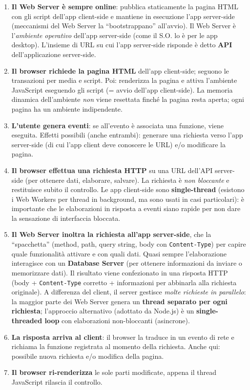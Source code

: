 \begin{enumerate}
  \item \textbf{Il Web Server \`e sempre online}: pubblica staticamente la pagina HTML con gli
        script dell'app client-side e mantiene in esecuzione l'app server-side (meccanismi del
        Web Server la ``bootstrappano'' all'avvio). Il Web Server \`e l'\emph{ambiente
        operativo} dell'app server-side (come il S.O. lo \`e per le app desktop). L'insieme
        di URL su cui l'app server-side risponde \`e detto \textbf{API} dell'applicazione
        server-side.
  \item \textbf{Il browser richiede la pagina HTML} dell'app client-side; seguono le
        transazioni per media e script. Poi: renderizza la pagina e attiva l'ambiente
        JavaScript eseguendo gli script (= avvio dell'app client-side). La memoria dinamica
        dell'ambiente \emph{non} viene resettata finch\'e la pagina resta aperta; ogni pagina
        ha un ambiente indipendente.
  \item \textbf{L'utente genera eventi}: se all'evento \`e associata una funzione, viene
        eseguita. Effetti possibili (anche entrambi): generare una richiesta verso l'app
        server-side (di cui l'app client deve conoscere le URL) e/o modificare la pagina.
  \item \textbf{Il browser effettua una richiesta HTTP} su una URL dell'API server-side
        (per ottenere dati, elaborare, salvare). La richiesta \`e \emph{non bloccante} e
        restituisce subito il controllo. Le app client-side sono \textbf{single-thread}
        (esistono i Web Workers per thread in background, ma sono usati in casi particolari):
        \`e importante che le elaborazioni in risposta a eventi siano rapide per non dare la
        sensazione di interfaccia bloccata.
  \item \textbf{Il Web Server inoltra la richiesta all'app server-side}, che la ``spacchetta''
        (method, path, query string, body con \texttt{Content-Type}) per capire quale
        funzionalit\`a attivare e con quali dati. Quasi sempre l'elaborazione interagisce con
        un \textbf{Database Server} (per ottenere informazioni da inviare o memorizzare dati).
        Il risultato viene confezionato in una risposta HTTP (body + \texttt{Content-Type}
        corretto + informazioni per abbinarla alla richiesta originale).
        A differenza del client, il server gestisce \emph{molte richieste in parallelo}: la
        maggior parte dei Web Server genera un \textbf{thread separato per ogni richiesta};
        l'approccio alternativo (adottato da Node.js) \`e un \textbf{single-threaded loop}
        con elaborazioni non-bloccanti (asincrone).
  \item \textbf{La risposta arriva al client}: il browser la traduce in un evento di rete e
        richiama la funzione registrata al momento della richiesta. Anche qui: possibile nuova
        richiesta e/o modifica della pagina.
  \item \textbf{Il browser ri-renderizza} le sole parti modificate, appena il thread
        JavaScript rilascia il controllo.
\end{enumerate}

